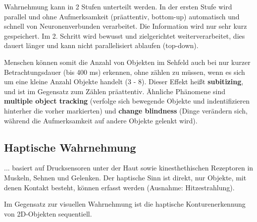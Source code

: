 Wahrnehmung kann in 2 Stufen unterteilt werden. In der ersten Stufe wird parallel
und ohne Aufmerksamkeit (präattentiv, bottom-up) automatisch und schnell von Neuronenverbunden
verarbeitet. Die Information wird nur sehr kurz gespeichert. Im 2. Schritt wird
bewusst und zielgerichtet weiterverarbeitet, dies dauert länger und kann nicht
parallelisiert ablaufen (top-down).

Menschen können somit die Anzahl von Objekten im Sehfeld auch bei nur kurzer
Betrachtungsdauer (bis 400 ms) erkennen, ohne zählen zu müssen, wenn es sich um eine
kleine Anzahl Objekte handelt (3 - 8). Dieser Effekt heißt \textbf{subitizing}, und
ist im Gegensatz zum Zählen präattentiv. Ähnliche Phänomene sind \textbf{multiple object
tracking} (verfolge sich bewegende Objekte und indentifizieren hinterher die vorher
markierten) und \textbf{change blindness} (Dinge verändern sich, während die Aufmerksamkeit
auf andere Objekte gelenkt wird).

\subsection{Haptische Wahrnehmung}

... basiert auf Drucksensoren unter der Haut sowie kinesthethischen Rezeptoren in Muskeln,
Sehnen und Gelenken. Der haptische Sinn ist direkt, nur Objekte, mit denen Kontakt besteht,
können erfasst werden (Ausnahme: Hitzestrahlung).

Im Gegensatz zur visuellen Wahrnehmung ist die haptische Konturenerkennung von 2D-Objekten
sequentiell.
